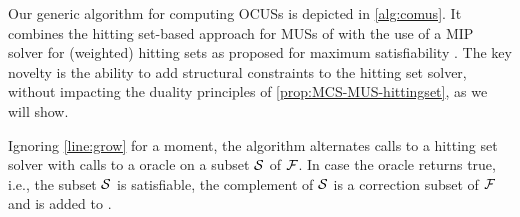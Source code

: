 %
Our generic algorithm for computing OCUSs is depicted in \cref{alg:comus}. It combines the hitting set-based approach for MUSs of \cite{ignatiev2015smallest} with the use of a MIP solver for (weighted) hitting sets as proposed for maximum satisfiability \cite{DBLP:conf/sat/DaviesB13}. The key novelty is the ability to add structural constraints to the hitting set solver, without impacting the duality principles of \cref{prop:MCS-MUS-hittingset}, as we will show.

Ignoring \cref{line:grow} for a moment, 
the algorithm alternates calls to a hitting set solver with calls to a \sat oracle on a subset $\mathcal{S}$ of $\mathcal{F} $. 
In case the \sat oracle returns true, i.e., the subset $\mathcal{S}$ is satisfiable, the complement of $\mathcal{S}$ is a correction subset of $\mathcal{F}$ and is added to \setstohit. %

